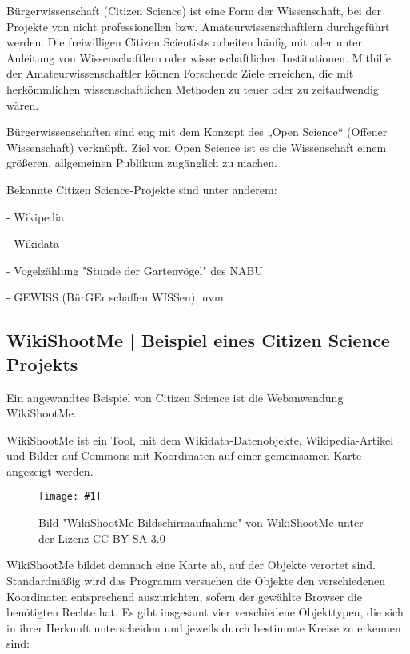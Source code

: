 \documentclass{article}
\newlength{\imgwidth}
\newcommand\scaledgraphics[2]{%
                
\settowidth{\imgwidth}{\texttt{[image: \#1]}}%
                
\setlength{\imgwidth}{\minof{\imgwidth}{#2\textwidth}}%
                
\texttt{[image: \#1]}%
                
}
\begin{document}
Bürgerwissenschaft (Citizen Science) ist eine Form der Wissenschaft, bei der Projekte von nicht professionellen bzw. Amateurwissenschaftlern durchgeführt werden. Die freiwilligen Citizen Scientists arbeiten häufig mit oder unter Anleitung von Wissenschaftlern oder wissenschaftlichen Institutionen. Mithilfe der Amateurwissenschaftler können Forschende Ziele erreichen, die mit herkömmlichen wissenschaftlichen Methoden zu teuer oder zu zeitaufwendig wären.


Bürgerwissenschaften sind eng mit dem Konzept des „Open Science“ (Offener Wissenschaft) verknüpft. Ziel von Open Science ist es die Wissenschaft einem größeren, allgemeinen Publikum zugänglich zu machen. \autocite{MunkeMartin2019}


Bekannte Citizen Science-Projekte sind unter anderem:

- Wikipedia

- Wikidata

- Vogelzählung "Stunde der Gartenvögel" des NABU

- GEWISS (BürGEr schaffen WISSen), uvm.


\subsection{WikiShootMe | Beispiel eines Citizen Science Projekts}\label{H8329586}



Ein angewandtes Beispiel von Citizen Science ist die Webanwendung WikiShootMe.


WikiShootMe ist ein Tool, mit dem Wikidata-Datenobjekte, Wikipedia-Artikel und Bilder auf Commons mit Koordinaten auf einer gemeinsamen Karte angezeigt werden.

\begin{wrapfigure}{l}{0.5\textwidth}
\scaledgraphics{9506af52-8c01-453c-9edd-64e23ba4870a.png}{0.5}
\caption*{Bild "WikiShootMe Bildschirmaufnahme" von WikiShootMe unter der Lizenz \href{https://creativecommons.org/licenses/by-sa/3.0/deed.de}{CC BY-SA 3.0}}\label{F29691221}
\end{wrapfigure}


WikiShootMe bildet demnach eine Karte ab, auf der Objekte verortet sind. Standardmäßig wird das Programm versuchen die Objekte den verschiedenen Koordinaten entsprechend auszurichten, sofern der gewählte Browser die benötigten Rechte hat. Es gibt insgesamt vier verschiedene Objekttypen, die sich in ihrer Herkunft unterscheiden und jeweils durch bestimmte Kreise zu erkennen sind:
\end{document}
